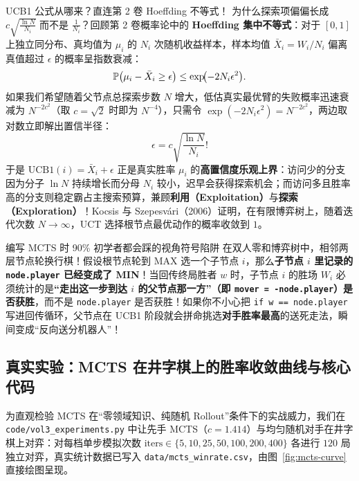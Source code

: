 \begin{recallBox}{UCB1 公式从哪来？直连第 2 卷 Hoeffding 不等式！}
为什么探索项偏偏长成 $c\sqrt{\frac{\ln N}{N_i}}$ 而不是 $\frac{1}{N_i}$？回顾第 2 卷概率论中的 \textbf{Hoeffding 集中不等式}：对于 $[0,1]$ 上独立同分布、真均值为 $\mu_i$ 的 $N_i$ 次随机收益样本，样本均值 $\bar{X}_i = W_i/N_i$ 偏离真值超过 $\epsilon$ 的概率呈指数衰减：
\[
  \mathbb{P}\bigl(\mu_i - \bar{X}_i \ge \epsilon\bigr) \le \exp\!\bigl(-2 N_i \epsilon^2\bigr).
\]
如果我们希望随着父节点总探索步数 $N$ 增大，低估真实最优臂的失败概率迅速衰减为 $N^{-2c^2}$（取 $c=\sqrt{2}$ 时即为 $N^{-4}$），只需令 $\exp(-2 N_i \epsilon^2) = N^{-2c^2}$，两边取对数立即解出置信半径：
\[
  \epsilon = c\sqrt{\frac{\ln N}{N_i}}!
\]
于是 $\mathrm{UCB1}(i) = \bar{X}_i + \epsilon$ 正是真实胜率 $\mu_i$ 的\textbf{高置信度乐观上界}：访问少的分支因为分子 $\ln N$ 持续增长而分母 $N_i$ 较小，迟早会获得探索机会；而访问多且胜率高的分支则稳定霸占主搜索预算，兼顾\textbf{利用（Exploitation）}与\textbf{探索（Exploration）}！Kocsis 与 Szepesvári（2006）证明，在有限博弈树上，随着迭代次数 $N \to \infty$，UCT 选择根节点最优动作的概率收敛到 $1$。
\end{recallBox}

\begin{failBox}{编写 MCTS 时 90\% 初学者都会踩的视角符号陷阱}
在双人零和博弈树中，相邻两层节点轮换行棋！假设根节点轮到 \textsf{MAX} 选一个子节点 $i$，那么\textbf{子节点 $i$ 里记录的 \texttt{node.player} 已经变成了 \textsf{MIN}}！当回传终局胜者 $w$ 时，子节点 $i$ 的胜场 $W_i$ 必须统计的是\textbf{“走出这一步到达 $i$ 的父节点那一方”（即 \texttt{mover = -node.player}）是否获胜}，而不是 \texttt{node.player} 是否获胜！如果你不小心把 \texttt{if w == node.player} 写进回传循环，父节点在 UCB1 阶段就会拼命挑选\textbf{对手胜率最高}的送死走法，瞬间变成“反向送分机器人”！
\end{failBox}

\subsection{真实实验：MCTS 在井字棋上的胜率收敛曲线与核心代码}

为直观检验 MCTS 在“零领域知识、纯随机 Rollout”条件下的实战威力，我们在 \texttt{code/\allowbreak vol3\_experiments.py} 中让先手 MCTS（$c=1.414$）与均匀随机对手在井字棋上对弈：对每档单步模拟次数 $\text{iters} \in \{5,\allowbreak 10,\allowbreak 25,\allowbreak 50,\allowbreak 100,\allowbreak 200,\allowbreak 400\}$ 各进行 $120$ 局独立对弈，真实统计数据已写入 \texttt{data/mcts\_winrate.csv}，由图~\ref{fig:mcts-curve} 直接绘图呈现。

